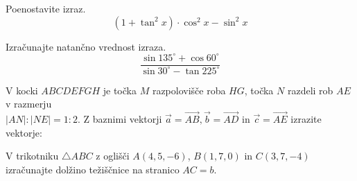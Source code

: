 \documentclass[addpoints]{exam}
\begin{document}
\begin{questions}


    \question[3]
    Poenostavite izraz. 
    $$ \left(1 + \tan^2x\right)\cdot\cos^2x-\sin^2x$$

    \begin{solution}[6.5cm]
       
    \end{solution}



    \question[4]
    Izračunajte natančno vrednost izraza. 
    $$ \dfrac{\sin{135^\circ} + \cos{60^\circ}}{\sin{30^\circ} - \tan{225^\circ}}$$

    \begin{solution}[6cm]
       
    \end{solution}


\newpage

    \question
    V kocki $ABCDEFGH$ je točka $M$ razpolovišče roba $HG$, točka $N$ razdeli rob $AE$ v razmerju \\ $|AN|:|NE|=1:2$.
    Z baznimi vektorji $\overrightarrow{a}=\overrightarrow{AB}, \overrightarrow{b}=\overrightarrow{AD}$ in $\overrightarrow{c}=\overrightarrow{AE}$ izrazite vektorje: 

    \begin{solution}[5cm]

    \end{solution}

    

    

    \question[3]
    V trikotniku $\triangle ABC$ z oglišči $A(4,5,-6)$, $B(1,7,0)$ in $C(3,7,-4)$ izračunajte dolžino težiščnice na stranico $AC=b$.


\end{questions}
\end{document}

